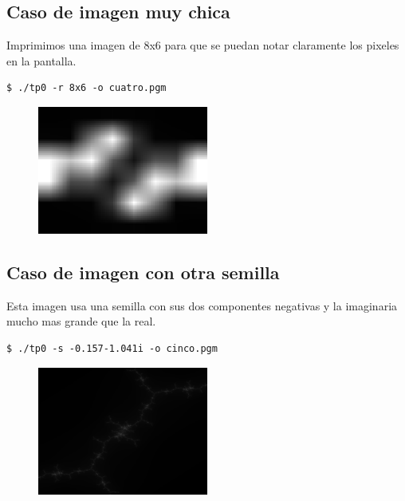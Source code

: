 \documentclass[a4paper,10pt]{article}
\begin{document}
\newpage

\subsection{Caso de imagen muy chica}

Imprimimos una imagen de 8x6 para que se puedan notar claramente los pixeles en la pantalla.

\begin{lstlisting}[frame=single]
$ ./tp0 -r 8x6 -o cuatro.pgm
\end{lstlisting}

\begin{figure}[H]
\begin{center}
\includegraphics[width=0.5\textwidth]{imagenes/cuatro.png}
\caption{} \label{cuatro}
\end{center}
\end{figure}

\subsection{Caso de imagen con otra semilla}

Esta imagen usa una semilla con sus dos componentes negativas y la imaginaria mucho mas grande que la real.
\begin{lstlisting}[frame=single]
$ ./tp0 -s -0.157-1.041i -o cinco.pgm
\end{lstlisting}

\begin{figure}[H]
\begin{center}
\includegraphics[width=0.5\textwidth]{imagenes/cinco.png}
\caption{} \label{cinco}
\end{center}
\end{figure}
\end{document}
